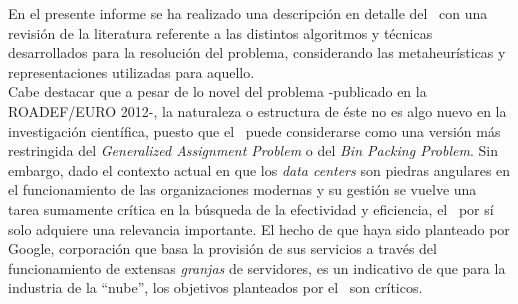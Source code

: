 
En el presente informe se ha realizado una descripción en detalle del \mrp\, con una revisión de la literatura referente a las distintos algoritmos y técnicas desarrollados para la resolución del problema, considerando las metaheurísticas y representaciones utilizadas para aquello. \\
Cabe destacar que a pesar de lo novel del problema -publicado en la ROADEF/EURO 2012-, la naturaleza o estructura de éste no es algo nuevo en la investigación científica, puesto que el \mrp\ puede considerarse como una versión más restringida del \textit{Generalized Assignment Problem} o del \textit{Bin Packing Problem}. Sin embargo, dado el contexto actual en que los \textit{data centers} son piedras angulares en el funcionamiento de las organizaciones modernas y su gestión se vuelve una tarea sumamente crítica en la búsqueda de la efectividad y eficiencia, el \mrp\ por sí solo adquiere una relevancia importante. El hecho de que haya sido planteado por Google, corporación que basa la provisión de sus servicios a través del funcionamiento de extensas \textit{granjas} de servidores, es un indicativo de que para la industria de la ``nube'', los objetivos planteados por el  \mrp\ son críticos. \\
